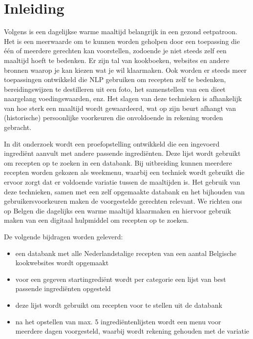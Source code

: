 \documentclass{hogent-article}
\begin{document}


\section{Inleiding}%
\label{sec:inleiding}


Volgens \textcite{Galle2016} is een dagelijkse warme maaltijd belangrijk in een gezond eetpatroon. Het is een meerwaarde om te kunnen worden geholpen door een toepassing die één of meerdere gerechten kan voorstellen, zodoende je niet steeds zelf een maaltijd hoeft te bedenken. Er zijn tal van kookboeken, websites en andere bronnen waarop je kan kiezen wat je wil klaarmaken. Ook worden er steeds meer toepassingen ontwikkeld die NLP gebruiken om recepten zelf te bedenken, bereidingswijzen te destilleren uit een foto, het samenstellen van een dieet naargelang voedingswaarden, enz. Het slagen van deze technieken is afhankelijk van hoe sterk een maaltijd wordt gewaardeerd, wat op zijn beurt afhangt van (historische) persoonlijke voorkeuren die onvoldoende in rekening worden gebracht.

In dit onderzoek wordt een proefopstelling ontwikkeld die een ingevoerd ingrediënt aanvult met andere passende ingrediënten. Deze lijst wordt gebruikt om recepten op te zoeken in een databank. Bij uitbreiding kunnen meerdere recepten worden gekozen als weekmenu, waarbij een techniek wordt gebruikt die ervoor zorgt dat er voldoende variatie tussen de maaltijden is. Het gebruik van deze technieken, samen met een zelf opgemaakte databank en het bijhouden van gebruikersvoorkeuren maken de voorgestelde gerechten relevant. We richten ons op Belgen die dagelijks een warme maaltijd klaarmaken en hiervoor gebruik maken van een digitaal hulpmiddel om recepten op te zoeken. 

De volgende bijdragen worden geleverd:
\begin{itemize}
    \item een databank met alle Nederlandstalige recepten van een aantal Belgische kookwebsites wordt opgemaakt
    \item voor een gegeven startingrediënt wordt per categorie een lijst van best passende ingrediënten opgesteld
    \item deze lijst wordt gebruikt om recepten voor te stellen uit de databank
    \item na het opstellen van max. 5 ingrediëntenlijsten wordt een menu voor meerdere dagen voorgesteld, waarbij wordt rekening gehouden met de variatie
\end{itemize}
\end{document}
